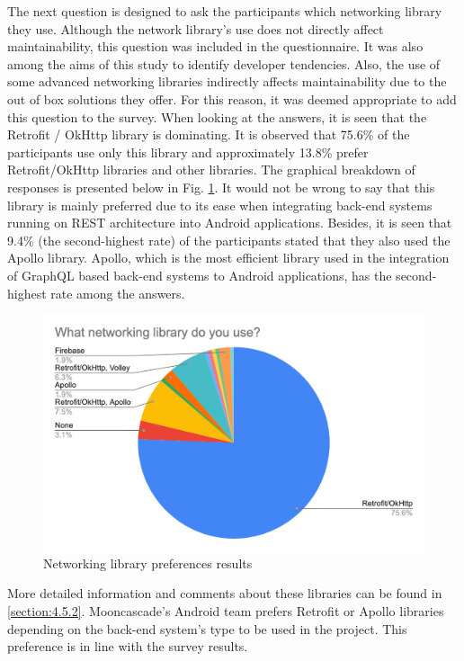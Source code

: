 The next question is designed to ask the participants which networking library they use. Although the network library's use does not directly affect maintainability, this question was included in the questionnaire. It was also among the aims of this study to identify developer tendencies. Also, the use of some advanced networking libraries indirectly affects maintainability due to the out of box solutions they offer. For this reason, it was deemed appropriate to add this question to the survey. When looking at the answers, it is seen that the Retrofit / OkHttp library is dominating. It is observed that 75.6\% of the participants use only this library and approximately 13.8\% prefer Retrofit/OkHttp libraries and other libraries. The graphical breakdown of responses is presented below in Fig. \ref{fig:networking_lib}. It would not be wrong to say that this library is mainly preferred due to its ease when integrating back-end systems running on REST architecture into Android applications. Besides, it is seen that 9.4\% (the second-highest rate) of the participants stated that they also used the Apollo library. Apollo, which is the most efficient library used in the integration of GraphQL based back-end systems to Android applications, has the second-highest rate among the answers.
\begin{figure}[ht!]
    \centering
    \includegraphics[scale=0.25]{figures/networking_lib.png}
    \caption{Networking library preferences results}
    \label{fig:networking_lib}
\end{figure}
\FloatBarrier

More detailed information and comments about these libraries can be found in \ref{section:4.5.2}. Mooncascade's Android team prefers Retrofit or Apollo libraries depending on the back-end system’s type to be used in the project. This preference is in line with the survey results.

